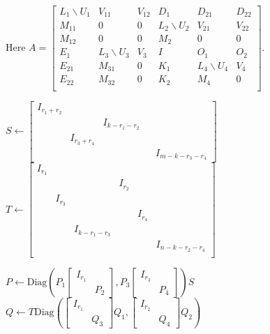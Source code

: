\documentclass{article}
\begin{document}
{\begin{algorithm}[H]
\begin{algorithmic}
    \State Here $A=
    \left[\begin{array}{ccc|cccc}
      L_1 \backslash U_1& V_{11}&V_{12}& D_1 &D_{21}&D_{22}\\
      M_{11}               & 0  &0& L_2\backslash U_2 & V_{21}&V_{22}\\
      M_{12}               & 0  &0& M_2 & 0&0\\
      \hline
      E_1               & L_3\backslash U_3&V_3& I &O_1 &O_2\\
      E_{21}               & M_{31}              &0  & K_1 & L_4\backslash U_4 &V_4\\
      E_{22}               & M_{32}              &0  & K_2 & M_4 &0\\
    \end{array}\right]$.

\State $S\leftarrow \begin{bmatrix}
  I_{r_1+r_2}\\
  &&I_{k-r_1-r_2}\\
  &I_{r_3+r_4}\\
  &&&&I_{m-k-r_3-r_4}
\end{bmatrix}$
\State $T\leftarrow \begin{bmatrix}
  I_{r_1}\\
        &      &          &I_{r_2} & \\
        &I_{r_3}&          &       & \\
        &      &          &       & I_{r_4}\\
        &      &I_{k-r_1-r_3}\\
        &      &          &       &       & I_{n-k-r_2-r_4}\\
\end{bmatrix}$

 \State $P\leftarrow \text{Diag}(
   P_1
   \begin{bmatrix}
     I_{r_1}\\&P_2
   \end{bmatrix},P_3
   \begin{bmatrix}
     I_{r_3}\\&P_4
   \end{bmatrix} ) S$
\State $Q\leftarrow
T\text{Diag}(\begin{bmatrix}
     I_{r_1}\\&Q_3
   \end{bmatrix}
 Q_1,\begin{bmatrix}
     I_{r_2}\\&Q_4
   \end{bmatrix}
 Q_2)$




\end{algorithmic}
\end{algorithm}}
\end{document}
